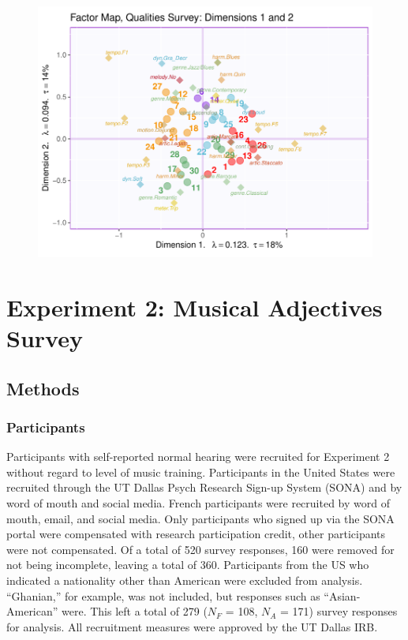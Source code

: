 \documentclass[
  english,
  man,floatsintext]{apa6}
\begin{document}
\begin{figure}

{\centering \includegraphics[width=0.75\linewidth]{Music-Descriptor-Space_files/figure-latex/factormapsQ-1} 

}

\caption{ }\label{fig:factormapsQ}
\end{figure}

\hypertarget{experiment-2-musical-adjectives-survey}{%
\section{Experiment 2: Musical Adjectives Survey}\label{experiment-2-musical-adjectives-survey}}

\hypertarget{methods-1}{%
\subsection{Methods}\label{methods-1}}

\hypertarget{participants-2}{%
\subsubsection{Participants}\label{participants-2}}

Participants with self-reported normal hearing were recruited for Experiment 2 without regard to level of music training. Participants in the United States were recruited through the UT Dallas Psych Research Sign-up System (SONA) and by word of mouth and social media. French participants were recruited by word of mouth, email, and social media. Only participants who signed up via the SONA portal were compensated with research participation credit, other participants were not compensated. Of a total of 520 survey responses, 160 were removed for not being incomplete, leaving a total of 360. Participants from the US who indicated a nationality other than American were excluded from analysis. ``Ghanian,'' for example, was not included, but responses such as ``Asian-American'' were. This left a total of 279 (\(\textit{N}_F\) = 108, \(\textit{N}_A\) = 171) survey responses for analysis. All recruitment measures were approved by the UT Dallas IRB.
\end{document}
